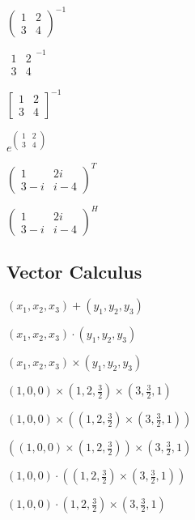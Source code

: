 \documentclass{article}
\begin{document}
$\left( 
\begin{array}{cc}
1 & 2 \\ 
3 & 4%
\end{array}%
\right) ^{-1}$

$%
\begin{array}{cc}
1 & 2 \\ 
3 & 4%
\end{array}%
^{-1}$

$\left[ 
\begin{array}{cc}
1 & 2 \\ 
3 & 4%
\end{array}%
\right] ^{-1}$

$e^{\left( 
\begin{array}{cc}
1 & 2 \\ 
3 & 4%
\end{array}%
\right) }$

$\left( 
\begin{array}{cc}
1 & 2i \\ 
3-i & i-4%
\end{array}%
\right) ^{T}$

$\left( 
\begin{array}{cc}
1 & 2i \\ 
3-i & i-4%
\end{array}%
\right) ^{H}$

\subsection{Vector Calculus}

$\left( x_{1},x_{2},x_{3}\right) +\left( y_{1},y_{2},y_{3}\right) $

$\left( x_{1},x_{2},x_{3}\right) \cdot \left( y_{1},y_{2},y_{3}\right) $

$\left( x_{1},x_{2},x_{3}\right) \times \left( y_{1},y_{2},y_{3}\right) $

$\left( 1,0,0\right) \times \left( 1,2,\frac{3}{2}\right) \times \left( 3,%
\frac{3}{2},1\right) $

$\left( 1,0,0\right) \times \left( \left( 1,2,\frac{3}{2}\right) \times
\left( 3,\frac{3}{2},1\right) \right) $

$\left( \left( 1,0,0\right) \times \left( 1,2,\frac{3}{2}\right) \right)
\times \left( 3,\frac{3}{2},1\right) $

$\left( 1,0,0\right) \cdot \left( \left( 1,2,\frac{3}{2}\right) \times
\left( 3,\frac{3}{2},1\right) \right) $

$\left( 1,0,0\right) \cdot \left( 1,2,\frac{3}{2}\right) \times \left( 3,%
\frac{3}{2},1\right) $
\end{document}
